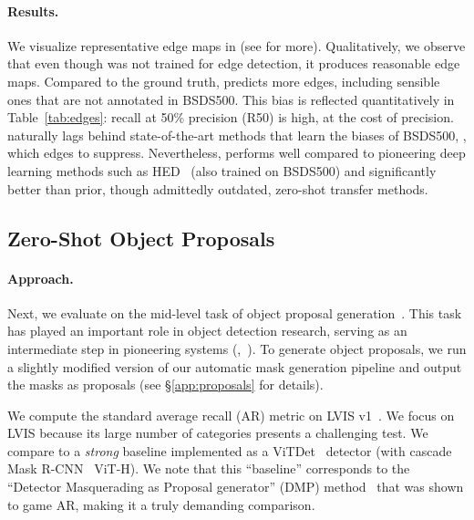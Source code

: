 \paragraph{Results.} We visualize representative edge maps in  (see  for more). Qualitatively, we observe that even though \sam was not trained for edge detection, it produces reasonable edge maps. Compared to the ground truth, \sam predicts more edges, including sensible ones that are not annotated in BSDS500. This bias is reflected quantitatively in Table~\ref{tab:edges}: recall at 50\% precision (R50) is high, at the cost of precision. \sam naturally lags behind state-of-the-art methods that learn the biases of BSDS500, \ie, which edges to suppress. Nevertheless, \sam performs well compared to pioneering deep learning methods such as HED~\cite{xie2015holistically} (also trained on BSDS500) and significantly better than prior, though admittedly outdated, zero-shot transfer methods.

\subsection{Zero-Shot Object Proposals}\label{subsec:proposals}

\paragraph{Approach.} Next, we evaluate \sam on the mid-level task of object proposal generation~\cite{alexe2010object,Sande2011}. This task has played an important role in object detection research, serving as an intermediate step in pioneering systems (\eg,~\cite{Sande2011,Girshick2014,Ren2015}). To generate object proposals, we run a slightly modified version of our automatic mask generation pipeline and output the masks as proposals (see \S\ref{app:proposals} for details).

We compute the standard average recall (AR) metric on LVIS v1~\cite{Gupta2019}. We focus on LVIS because its large number of categories presents a challenging test. We compare to a \emph{strong} baseline implemented as a ViTDet~\cite{li2022exploring} detector (with cascade Mask R-CNN~\cite{He2017,Cai2018} ViT-H). We note that this ``baseline'' corresponds to the ``Detector Masquerading as Proposal generator'' (DMP) method~\cite{chavali2016object} that was shown to game AR, making it a truly demanding comparison.


